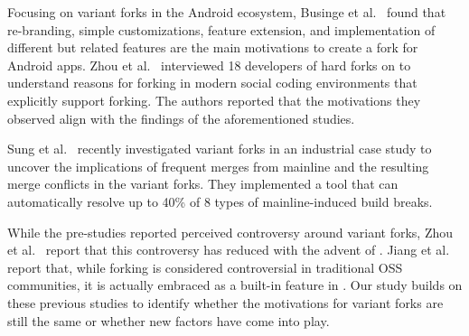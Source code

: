 
Focusing on variant forks in the Android ecosystem, Businge et al.~\cite{businge2018appfamilies} found that re-branding, simple customizations, feature extension, and implementation of different but related features are the main motivations to create a fork for Android apps.
Zhou et al.~\cite{Zhou:2020} interviewed 18 developers of hard forks on \gh to understand reasons for forking in modern social coding environments that explicitly support forking. The authors reported that the motivations they observed align with the findings of the aforementioned studies.

Sung et al.~\cite{sung:ICSE:2020} recently investigated variant forks in an industrial case study to uncover the implications of frequent merges from mainline and the resulting merge conflicts in the variant forks. They implemented a tool that can automatically resolve up to 40\% of 8 types of mainline-induced build breaks.

While the pre-\gh studies reported
perceived controversy
around variant forks, Zhou et al.~\cite{Zhou:2020} report that this controversy has reduced with the advent of \gh. Jiang et al.~\cite{Lo:2017} report that, while forking is considered controversial in traditional OSS communities, it is actually embraced as a built-in feature in \gh.
Our study builds on these previous studies to identify whether the motivations for variant forks are still the same or whether new factors have come into play.

